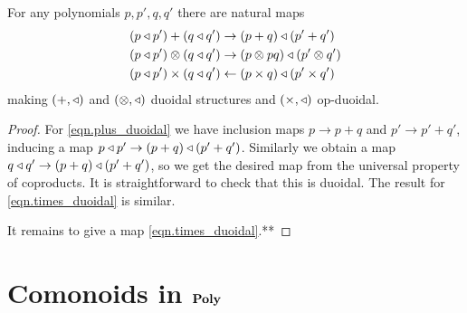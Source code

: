 \documentclass[DynamicalBook]{subfiles}
\begin{document}
\begin{proposition}
For any polynomials $p,p',q,q'$ there are natural maps
\begin{align}\label{eqn.plus_duoidal}
	(p\mathbin{\triangleleft} p')+(q\mathbin{\triangleleft} q')&\to (p+q)\mathbin{\triangleleft}(p'+q')\\\label{eqn.otimes_duoidal}
	(p\mathbin{\triangleleft} p')\otimes(q\mathbin{\triangleleft} q')&\to(p\otimes pq)\mathbin{\triangleleft}(p'\otimes q')\\\label{eqn.times_duoidal}
	(p\mathbin{\triangleleft} p')\times (q\mathbin{\triangleleft} q')&\leftarrow(p\times q)\mathbin{\triangleleft}(p'\times q')
\end{align}
making $(+,\mathbin{\triangleleft})$ and $(\otimes,\mathbin{\triangleleft})$ duoidal structures and $(\times,\mathbin{\triangleleft})$ op-duoidal.
\end{proposition}
\begin{proof}
For \eqref{eqn.plus_duoidal} we have inclusion maps $p\to p+q$ and $p'\to p'+q'$, inducing a map $p\mathbin{\triangleleft} p'\to(p+q)\mathbin{\triangleleft}(p'+q')$. Similarly we obtain a map $q\mathbin{\triangleleft} q'\to(p+q)\mathbin{\triangleleft}(p'+q')$, so we get the desired map from the universal property of coproducts. It is straightforward to check that this is duoidal. The result for \eqref{eqn.times_duoidal} is similar. 

It remains to give a map \eqref{eqn.times_duoidal}.**
\end{proof}



\section{Comonoids in $\textbf{Poly}$}
\end{document}
